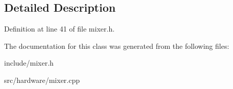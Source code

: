 \subsection{Detailed Description}


Definition at line 41 of file mixer.\-h.



The documentation for this class was generated from the following files\-:\begin{DoxyCompactItemize}
\item 
include/mixer.\-h\item 
src/hardware/mixer.\-cpp\end{DoxyCompactItemize}

